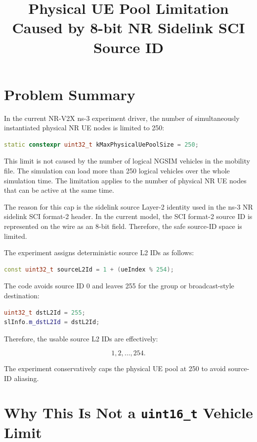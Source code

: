 \documentclass[11pt]{article}
\title{Physical UE Pool Limitation Caused by 8-bit NR Sidelink SCI Source ID}
\author{}
\date{}
\begin{document}
\maketitle

\section{Problem Summary}

In the current NR-V2X ns-3 experiment driver, the number of simultaneously instantiated physical NR UE nodes is limited to 250:

\begin{lstlisting}[language=C++]
static constexpr uint32_t kMaxPhysicalUePoolSize = 250;
\end{lstlisting}

This limit is not caused by the number of logical NGSIM vehicles in the mobility file. The simulation can load more than 250 logical vehicles over the whole simulation time. The limitation applies to the number of physical NR UE nodes that can be active at the same time.

The reason for this cap is the sidelink source Layer-2 identity used in the ns-3 NR sidelink SCI format-2 header. In the current model, the SCI format-2 source ID is represented on the wire as an 8-bit field. Therefore, the safe source-ID space is limited.

The experiment assigns deterministic source L2 IDs as follows:

\begin{lstlisting}[language=C++]
const uint32_t sourceL2Id = 1 + (ueIndex % 254);
\end{lstlisting}

The code avoids source ID 0 and leaves 255 for the group or broadcast-style destination:

\begin{lstlisting}[language=C++]
uint32_t dstL2Id = 255;
slInfo.m_dstL2Id = dstL2Id;
\end{lstlisting}

Therefore, the usable source L2 IDs are effectively:

\[
1,2,\ldots,254.
\]

The experiment conservatively caps the physical UE pool at 250 to avoid source-ID aliasing.

\section{Why This Is Not a \texttt{uint16\_t} Vehicle Limit}
\end{document}
